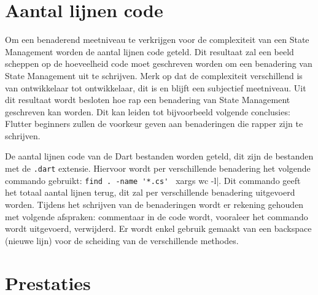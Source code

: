 \section{Aantal lijnen code}
Om een benaderend meetniveau te verkrijgen voor de complexiteit van een State Management worden de aantal lijnen code geteld. Dit resultaat zal een beeld scheppen op de hoeveelheid code moet geschreven worden om een benadering van State Management uit te schrijven. Merk op dat de complexiteit verschillend is van ontwikkelaar tot ontwikkelaar, dit is en blijft een subjectief meetniveau. Uit dit resultaat wordt besloten hoe rap een benadering van State Management geschreven kan worden. Dit kan leiden tot bijvoorbeeld volgende conclusies: Flutter beginners zullen de voorkeur geven aan benaderingen die rapper zijn te schrijven. 

De aantal lijnen code van de Dart bestanden worden geteld, dit zijn de bestanden met de \verb|.dart| extensie. Hiervoor wordt per verschillende benadering het volgende commando gebruikt: \verb|find . -name '*.cs' | xargs wc -l|. Dit commando geeft het totaal aantal lijnen terug, dit zal per verschillende benadering uitgevoerd worden. Tijdens het schrijven van de benaderingen wordt er rekening gehouden met volgende afspraken: commentaar in de code wordt, vooraleer het commando wordt uitgevoerd, verwijderd. Er wordt enkel gebruik gemaakt van een backspace (nieuwe lijn) voor de scheiding van de verschillende methodes.

\section{Prestaties}
\label{se:prestaties}


\lipsum[21-25]

